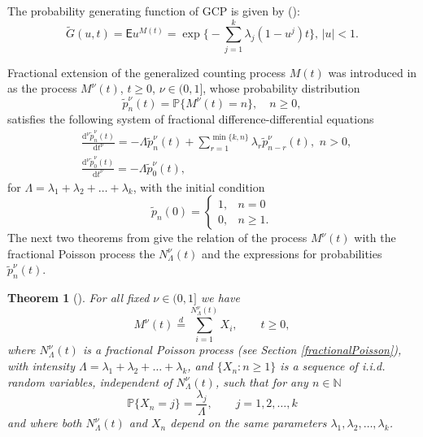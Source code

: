 \documentclass[12pt]{article}
\theoremstyle{definition}
\theoremstyle{plain}
\newtheorem{theorem}{Theorem}
\newcommand{\E}{\mathsf{E}}
\begin{document}
The probability generating function of GCP is given by (\cite{KK2022a}):
\begin{equation}
             \tilde G(u,t)=\E u^{M(t)}=\exp\Big\{
-\sum_{j=1}^{k}\lambda_j(1-u^j)t\Big\},\, |u|<1.
\end{equation}



Fractional extension of the generalized counting process $M(t)$ was introduced in \cite{DiC} as the process $M^\nu(t)$, $t \ge 0$, $\nu \in (0,1]$, whose probability distribution
$$
	\tilde p_n^\nu(t) = \mathbb{P}\{M^\nu(t) = n\}, \quad n\ge0,$$	
satisfies the following system of fractional difference-differential equations 
\begin{align}\label{Dic1}
	&\frac{\mathrm{d}^\nu \tilde p_n^\nu(t)}{\mathrm{d}t^\nu} = - \Lambda \tilde p_n^\nu(t) + \sum_{r=1}^{\min\{k,n\}} \lambda_r \tilde p_{n-r}^\nu(t),\,\, n>0,\\
	&\frac{\mathrm{d}^\nu \tilde p_0^\nu(t)}{\mathrm{d}t^\nu} = -\Lambda \tilde p_0^\nu(t), \nonumber
\end{align}
for $\Lambda = \lambda_1 + \lambda_2 + \dots + \lambda_k$,  with the initial condition
\begin{equation}\label{Dic2}
	\tilde p_n(0) = \begin{cases}
		1, & n = 0 \\
		0, & n \ge 1.
	\end{cases}
\end{equation}
The next two theorems from \cite{DiC} give the relation of the process $M^\nu(t)$ with the fractional Poisson process  the $N_\Lambda^\nu(t)$ and the expressions for  probabilities $\tilde p_n^\nu(t)$.
\begin{theorem}[\cite{DiC}]\label{thmDic}
	For all fixed $\nu \in (0, 1]$ we have
	\begin{equation}
		M^\nu(t) \stackrel{d}{=} \sum_{i=1}^{N_\Lambda^\nu(t)} X_i, \qquad t \ge 0,
	\end{equation}
	where $N_\Lambda^\nu(t)$ is a fractional Poisson process (see Section \ref{fractionalPoisson}), with intensity $\Lambda = \lambda_1 + \lambda_2 + \dots + \lambda_k$, and  $\{X_n : n \ge 1\}$ is a sequence of i.i.d. random variables, independent of $N_\Lambda^\nu(t)$, such that for any $n \in \mathbb{N}$
	\begin{equation}
		\mathbb{P}\{X_n = j\} = \frac{\lambda_j}{\Lambda}, \qquad j = 1, 2, \dots, k
	\end{equation}
	and where both $N_\Lambda^\nu(t)$ and $X_n$ depend on the same parameters $\lambda_1, \lambda_2, \dots, \lambda_k$.
\end{theorem}
\end{document}
